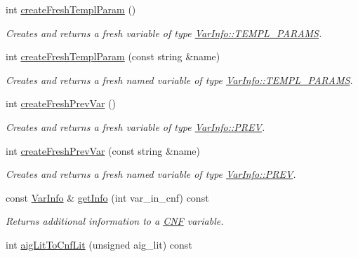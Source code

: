 \begin{DoxyCompactItemize}
int \hyperlink{classVarManager_af06342ed30ae9ef3440ceea268821c39}{create\-Fresh\-Templ\-Param} ()
\begin{DoxyCompactList}\small\item\em Creates and returns a fresh variable of type \hyperlink{classVarInfo_a64d1da76cf84fe674e5fef9764ef11cfa5df778a9d0a12c26b1725f2440d66ff4}{Var\-Info\-::\-T\-E\-M\-P\-L\-\_\-\-P\-A\-R\-A\-M\-S}. \end{DoxyCompactList}\item 
int \hyperlink{classVarManager_ad05222a9e211e348c0d24224f6aa9e30}{create\-Fresh\-Templ\-Param} (const string \&name)
\begin{DoxyCompactList}\small\item\em Creates and returns a fresh named variable of type \hyperlink{classVarInfo_a64d1da76cf84fe674e5fef9764ef11cfa5df778a9d0a12c26b1725f2440d66ff4}{Var\-Info\-::\-T\-E\-M\-P\-L\-\_\-\-P\-A\-R\-A\-M\-S}. \end{DoxyCompactList}\item 
int \hyperlink{classVarManager_adf8ceeecece1626b6570a4741639a25f}{create\-Fresh\-Prev\-Var} ()
\begin{DoxyCompactList}\small\item\em Creates and returns a fresh variable of type \hyperlink{classVarInfo_a64d1da76cf84fe674e5fef9764ef11cfa055ef2ea16e83d02bc2b9f2f7f7666df}{Var\-Info\-::\-P\-R\-E\-V}. \end{DoxyCompactList}\item 
int \hyperlink{classVarManager_a9ba4164cf6fce6ca6f0311f2c820686a}{create\-Fresh\-Prev\-Var} (const string \&name)
\begin{DoxyCompactList}\small\item\em Creates and returns a fresh named variable of type \hyperlink{classVarInfo_a64d1da76cf84fe674e5fef9764ef11cfa055ef2ea16e83d02bc2b9f2f7f7666df}{Var\-Info\-::\-P\-R\-E\-V}. \end{DoxyCompactList}\item 
const \hyperlink{classVarInfo}{Var\-Info} \& \hyperlink{classVarManager_a2c7bcd84b002efa9f10c622401efb13f}{get\-Info} (int var\-\_\-in\-\_\-cnf) const 
\begin{DoxyCompactList}\small\item\em Returns additional information to a \hyperlink{classCNF}{C\-N\-F} variable. \end{DoxyCompactList}\item 
int \hyperlink{classVarManager_a9015ec7f557feb7619fdc0f7e18b57fa}{aig\-Lit\-To\-Cnf\-Lit} (unsigned aig\-\_\-lit) const 

\end{DoxyCompactItemize}
